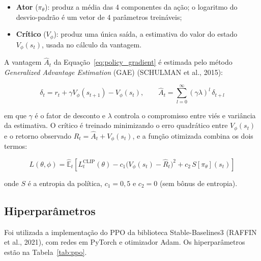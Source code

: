 \begin{itemize}
    \item \textbf{Ator} ($\pi_\theta$): produz a média das 4 componentes da ação; o logaritmo do desvio-padrão é um vetor de 4 parâmetros treináveis;
    \item \textbf{Crítico} ($V_\phi$): produz uma única saída, a estimativa do valor do estado $V_\phi(s_t)$, usada no cálculo da vantagem.
\end{itemize}

A vantagem $\hat{A}_t$ da Equação~\ref{eq:policy_gradient} é estimada pelo método \textit{Generalized Advantage Estimation} (GAE) (SCHULMAN et al., 2015):

\begin{equation}
    \delta_t = r_t + \gamma V_\phi(s_{t+1}) - V_\phi(s_t), \qquad
    \hat{A}_t = \sum_{l=0}^{\infty} (\gamma\lambda)^l \, \delta_{t+l}
    \label{eq:gae}
\end{equation}

\noindent em que $\gamma$ é o fator de desconto e $\lambda$ controla o compromisso entre viés e variância da estimativa. O crítico é treinado minimizando o erro quadrático entre $V_\phi(s_t)$ e o retorno observado $\hat{R}_t = \hat{A}_t + V_\phi(s_t)$, e a função otimizada combina os dois termos:

\begin{equation}
    L(\theta, \phi) = \hat{\mathbb{E}}_t \left[ L^{\text{CLIP}}_t(\theta) - c_1 \big( V_\phi(s_t) - \hat{R}_t \big)^2 + c_2 \, S[\pi_\theta](s_t) \right]
    \label{eq:ppo_total}
\end{equation}

\noindent onde $S$ é a entropia da política, $c_1 = 0{,}5$ e $c_2 = 0$ (sem bônus de entropia).

\subsection{Hiperparâmetros}

Foi utilizada a implementação do PPO da biblioteca Stable-Baselines3 (RAFFIN et al., 2021), com redes em PyTorch e otimizador Adam. Os hiperparâmetros estão na Tabela~\ref{tab:ppo}.

